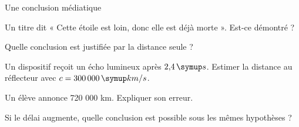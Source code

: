 \par\noindent\begin{minipage}{\linewidth}
\begin{exercice}[3]{Une conclusion médiatique}
\begin{questions}
\item Un titre dit « Cette étoile est loin, donc elle est déjà morte ». Est-ce démontré ?
\item Quelle conclusion est justifiée par la distance seule ?
\end{questions}
\end{exercice}
\end{minipage}
\label{defi-ex-16}
\begin{questions}
\item Un dispositif reçoit un écho lumineux après $2{,}4\unite s$. Estimer la distance au réflecteur avec $c=300\,000\unite{km/s}$.
\item Un élève annonce 720 000 km. Expliquer son erreur.
\item Si le délai augmente, quelle conclusion est possible sous les mêmes hypothèses ?
\end{questions}
\pcGrille
